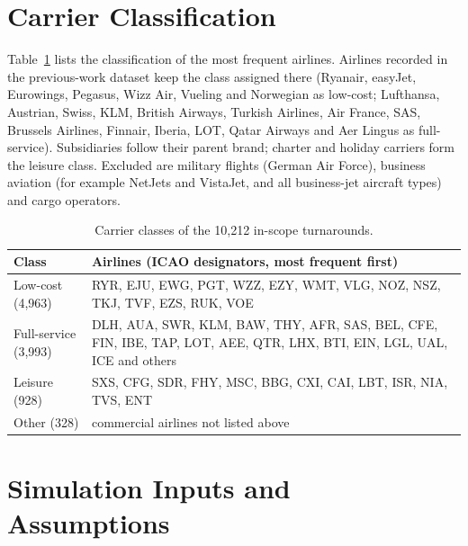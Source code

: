 \section{Carrier Classification}

Table~\ref{tab:carriers} lists the classification of the most frequent airlines. Airlines recorded in the previous-work dataset keep the class assigned there (Ryanair, easyJet, Eurowings, Pegasus, Wizz Air, Vueling and Norwegian as low-cost; Lufthansa, Austrian, Swiss, KLM, British Airways, Turkish Airlines, Air France, SAS, Brussels Airlines, Finnair, Iberia, LOT, Qatar Airways and Aer Lingus as full-service). Subsidiaries follow their parent brand; charter and holiday carriers form the leisure class. Excluded are military flights (German Air Force), business aviation (for example NetJets and VistaJet, and all business-jet aircraft types) and cargo operators.

\begin{table}[htbp]\centering\small
\begin{tabular}{lp{10.5cm}}\hline
Class & Airlines (ICAO designators, most frequent first)\\\hline
Low-cost (4,963) & RYR, EJU, EWG, PGT, WZZ, EZY, WMT, VLG, NOZ, NSZ, TKJ, TVF, EZS, RUK, VOE\\
Full-service (3,993) & DLH, AUA, SWR, KLM, BAW, THY, AFR, SAS, BEL, CFE, FIN, IBE, TAP, LOT, AEE, QTR, LHX, BTI, EIN, LGL, UAL, ICE and others\\
Leisure (928) & SXS, CFG, SDR, FHY, MSC, BBG, CXI, CAI, LBT, ISR, NIA, TVS, ENT\\
Other (328) & commercial airlines not listed above\\\hline
\end{tabular}
\caption{Carrier classes of the 10,212 in-scope turnarounds.}
\label{tab:carriers}
\end{table}

\section{Simulation Inputs and Assumptions}

